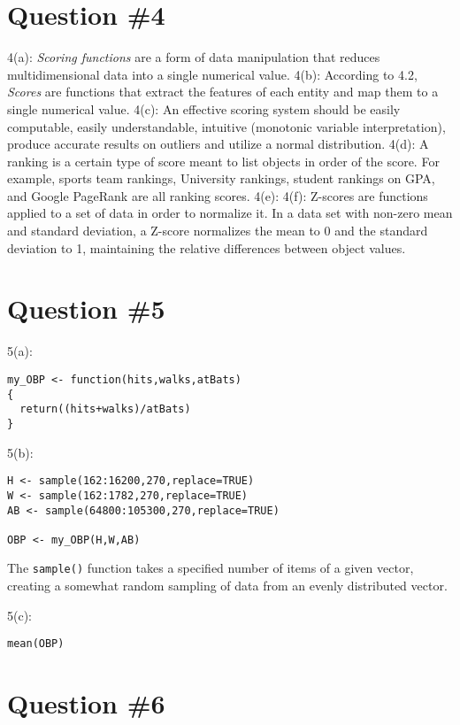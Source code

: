 \documentclass[]{article}
\begin{document}
\section{Question \#4}\label{question-4}

4(a): \emph{Scoring functions} are a form of data manipulation that
reduces multidimensional data into a single numerical value. 4(b):
According to 4.2, \emph{Scores} are functions that extract the features
of each entity and map them to a single numerical value. 4(c): An
effective scoring system should be easily computable, easily
understandable, intuitive (monotonic variable interpretation), produce
accurate results on outliers and utilize a normal distribution. 4(d): A
ranking is a certain type of score meant to list objects in order of the
score. For example, sports team rankings, University rankings, student
rankings on GPA, and Google PageRank are all ranking scores. 4(e): 4(f):
Z-scores are functions applied to a set of data in order to normalize
it. In a data set with non-zero mean and standard deviation, a Z-score
normalizes the mean to 0 and the standard deviation to 1, maintaining
the relative differences between object values.

\section{Question \#5}\label{question-5}

5(a):

\begin{verbatim}
my_OBP <- function(hits,walks,atBats)
{
  return((hits+walks)/atBats)
}
\end{verbatim}

5(b):

\begin{verbatim}
H <- sample(162:16200,270,replace=TRUE)
W <- sample(162:1782,270,replace=TRUE)
AB <- sample(64800:105300,270,replace=TRUE)

OBP <- my_OBP(H,W,AB)
\end{verbatim}

The \texttt{sample()} function takes a specified number of items of a
given vector, creating a somewhat random sampling of data from an evenly
distributed vector.

5(c):

\begin{verbatim}
mean(OBP)
\end{verbatim}

\section{Question \#6}\label{question-6}
\end{document}
